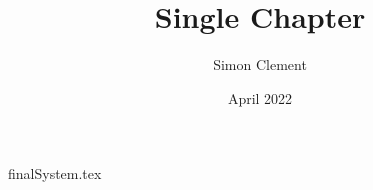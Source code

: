 \documentclass{article}
\title{Single Chapter}
\author{Simon Clement}
\date{April 2022}
\begin{document}
\def\cal{\mathscr}
\tableofcontents
{finalSystem.tex}
\end{document}

